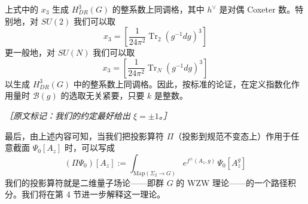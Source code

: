 上式中的 $x_{3}$ 生成 $H^{3}_{DR}(G)$ 的整系数上同调格，其中 $h^{\vee}$ 是对偶 Coxeter 数。特别地，对 $SU(2)$ 我们可以取
\begin{equation}
  x_{3}=\left[\frac{1}{24\pi^{2}}\operatorname{Tr}_{2}\left(g^{-1}dg\right)^{3}\right]
  \tag{3.63}
  \label{eq:3.63}
\end{equation}
更一般地，对 $SU(N)$ 我们可以取
\begin{equation}
  x_{3}=\left[\frac{1}{24\pi^{2}}\operatorname{Tr}_{N}\left(g^{-1}dg\right)^{3}\right]
  \tag{3.64}
  \label{eq:3.64}
\end{equation}
以生成 $H^{3}_{DR}(G)$ 中的整系数上同调格。因此，按标准的论证，在定义指数化作用量时 $\mathcal{B}(g)$ 的选取无关紧要，只要 $k$ 是整数。

{\small\itshape ［原文标记：我们的约定最好给出 $\xi=\pm1$。］}

最后，由上述内容可知，当我们把投影算符 $\Pi$（投影到规范不变态上）作用于任意截面 $\Psi_{0}[A_{z}]$ 时，可以写成
\begin{equation}
  (\Pi\Psi_{0})[A_{z}]:=\int_{\mathrm{Map}(\Sigma_2\to G)}e^{f^{\pm}(A_{z},g)}\,\Psi_{0}[A^{g}_{z}]
  \tag{3.65}
  \label{eq:3.65}
\end{equation}
我们的投影算符就是二维量子场论——即群 $G$ 的 WZW 理论——的一个路径积分。我们将在第 4 节进一步解释这一理论。

